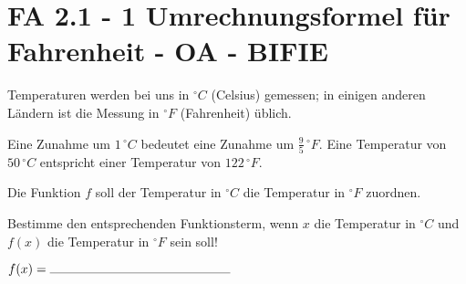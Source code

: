 \section{FA 2.1 - 1 Umrechnungsformel für Fahrenheit - OA - BIFIE}

\begin{beispiel}[FA 2.1]{1} %
Temperaturen werden bei uns in $^\circ C$ (Celsius) gemessen; in einigen anderen Ländern ist die Messung in $^\circ F$ (Fahrenheit) üblich.

Eine Zunahme um $1\,^\circ C$ bedeutet eine Zunahme um $\frac{9}{5}\,^\circ F$.
Eine Temperatur von $50\,^\circ C$ entspricht einer Temperatur von $122\,^\circ F$.

Die Funktion $f$ soll der Temperatur in $^\circ C$ die Temperatur in $^\circ F$ zuordnen.

Bestimme den entsprechenden Funktionsterm, wenn $x$ die Temperatur in $^\circ C$ und $f(x)$ die Temperatur in $^\circ F$ sein soll!
\leer

$f(x)=\rule{5cm}{0.3pt}$
\leer

\end{beispiel}